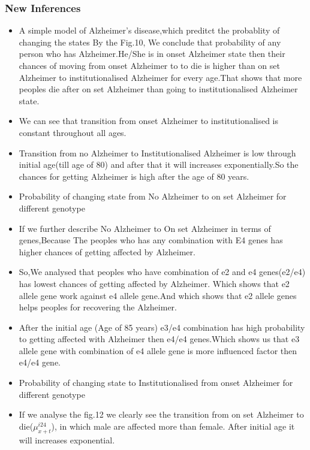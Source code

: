 \documentclass{article}
\begin{document}
\subsubsection{New Inferences}
\begin{itemize}
    \item A simple model of Alzheimer's disease,which preditct the probablity of changing the states
    \newline
    By the Fig.10, We conclude that probability of any person who has Alzheimer.He/She is in onset Alzheimer state then their chances of moving from onset Alzheimer to to die is higher than on set Alzheimer to institutionalised Alzheimer for every age.That shows that more peoples die after on set Alzheimer than going to institutionalised Alzheimer state.
     \item  We can see that transition from onset Alzheimer to institutionalised is constant throughout all ages.
    \item Transition from no Alzheimer to Institutionalised Alzheimer is low through initial age(till age of 80) and after that it will increases exponentially.So the chances for getting Alzheimer is high after the age of 80 years. 
    \newline
    \newline
    \item Probability of changing state from No Alzheimer to on set Alzheimer for different genotype
    \item If we further describe No Alzheimer to On set Alzheimer in terms of genes,Because The peoples who has any combination with E4 genes has higher chances of getting affected by Alzheimer.
    \item So,We analysed that peoples who have combination of e2 and e4 genes(e2/e4) has lowest chances of getting affected by Alzheimer. Which shows that e2 allele gene work against e4 allele gene.And which shows that e2 allele genes helps peoples for recovering the Alzheimer.
    \item After the initial age (Age of 85 years) e3/e4 combination has high probability to getting affected with Alzheimer then e4/e4 genes.Which shows us that e3 allele gene with combination of e4 allele gene is more influenced factor then e4/e4 gene.
    \newline
    \newline
    \item Probability of changing state to Institutionalised from onset Alzheimer for different genotype
    \item If we analyse the fig.12 we clearly see the transition from on set Alzheimer to die($\mu_{x+t}^{i24}$), in which male are affected more than female. After initial age it will increases exponential.

\end{itemize}
\end{document}

